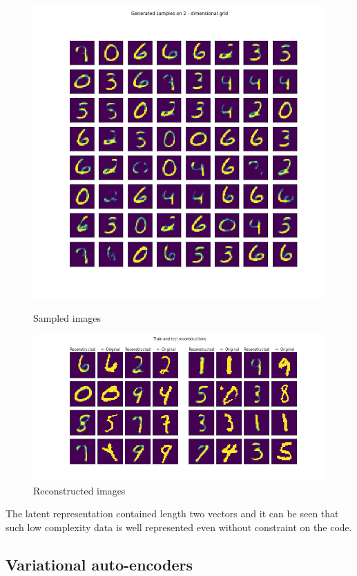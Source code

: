 \documentclass[12pt, english]{article}
\begin{document}
\begin{figure}[ht] 
  \label{fig:auto_encoder_results} 
  \begin{minipage}[b]{0.5\linewidth}
    \centering
    \includegraphics[width=.65\linewidth]{gen/generated_samples_mnist_auto_encoder.png} 
    \caption{Sampled images} 
  \end{minipage}%
  \begin{minipage}[b]{0.5\linewidth}
    \centering
    \includegraphics[width=.95\linewidth]{reco/reconstrunction_samples_mnist_auto_encoder.png} 
    \caption{Reconstructed images} 
  \end{minipage} 
\end{figure}

\vspace{4mm}

\par The latent representation contained length two vectors and it can be seen that such low complexity data is well represented even without constraint on the code.

\newpage

\subsection{Variational auto-encoders}
\end{document}
